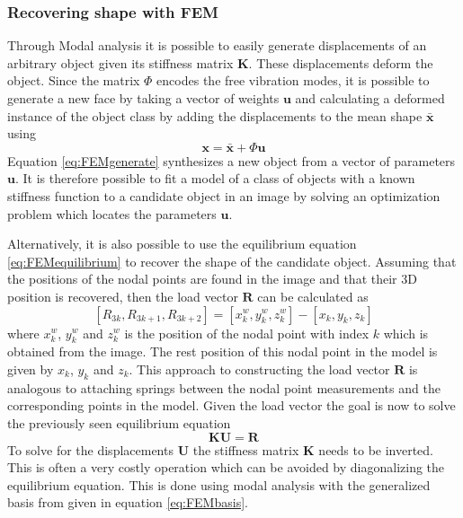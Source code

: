 \documentclass[11pt,a4paper,twoside]{report}
\begin{document}
\subsubsection{Recovering shape with FEM} 
Through Modal analysis it is possible to easily generate displacements of an
arbitrary object given its
stiffness matrix $\mathbf{K}$. These displacements deform the object. Since the
matrix $\Phi$ encodes the free vibration modes, it is possible to generate a new
face by taking a vector of weights $\mathbf{u}$ and calculating a deformed
instance of the object class by adding the displacements to the mean shape
$\mathbf{\bar{x}}$ using
\begin{equation}\label{eq:FEMgenerate}
\mathbf{x} =  \mathbf{\bar{x}} + \Phi\mathbf{u}
\end{equation}
Equation \ref{eq:FEMgenerate} synthesizes a new object from a vector of
parameters $\mathbf{u}$. It is therefore possible to fit a model of a class
of objects with a known stiffness function to a candidate object in an
image by solving an optimization problem which locates the parameters $\mathbf{u}$.

Alternatively, it is also possible to use the equilibrium equation
\ref{eq:FEMequilibrium} to recover the shape of the candidate object. Assuming
that the positions of the nodal points are found in the image and that their 3D
position is recovered, then the load vector $\mathbf{R}$ can be calculated as
\begin{equation}\label{eq:FEMload}
[R_{3k}, R_{3k+1}, R_{3k+2}] = [x^w_{k}, y^w_{k}, z^w_{k}] - [x_{k}, y_{k},
  z_{k}]
\end{equation}
where $x^w_{k}$, $y^w_{k}$ and $z^w_{k}$ is the position of the nodal point
with index $k$ which is obtained from the image. The rest position of this nodal point in the model is given by
$x_{k}$, $y_{k}$ and $z_{k}$. This approach to constructing the load vector
$\mathbf{R}$ is analogous to attaching springs between the nodal point
measurements and the corresponding points in the model. Given the load vector
the goal is now to solve the previously seen equilibrium equation 
\begin{equation}
\mathbf{K}\mathbf{U} = \mathbf{R}
\end{equation}
To solve for the displacements $\mathbf{U}$ the stiffness matrix $\mathbf{K}$
needs to be inverted. This is often a very costly operation which can be avoided
by diagonalizing the equilibrium equation. This is done using modal analysis
with the generalized
basis from given in equation \ref{eq:FEMbasis}.
\end{document}
